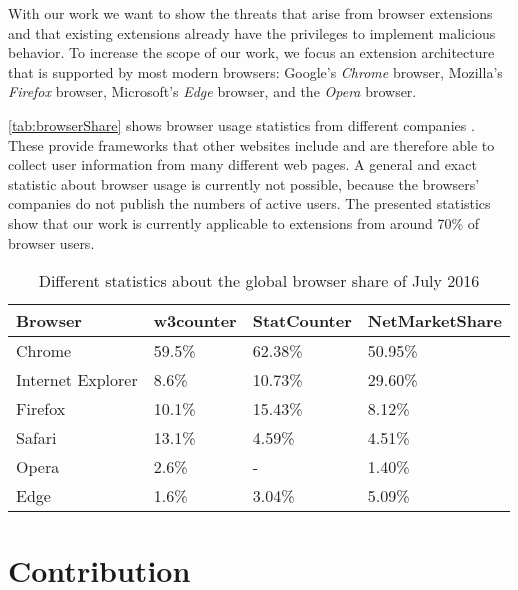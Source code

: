 	With our work we want to show the threats that arise from browser extensions and that existing extensions already have the privileges to implement malicious behavior. To increase the scope of our work, we focus an extension architecture that is supported by most modern browsers: Google's \textit{Chrome} browser, Mozilla's \textit{Firefox} browser, Microsoft's \textit{Edge} browser, and the \textit{Opera} browser.
	
	\autoref{tab:browserShare} shows browser usage statistics from different companies \cite{w3browserStats, statcounter, netmarketshare}. These provide frameworks that other websites include and are therefore able to collect user information from many different web pages. A general and exact statistic about browser usage is currently not possible, because the browsers' companies do not publish the numbers of active users. The presented statistics show that our work is currently applicable to extensions from around 70\% of browser users.

	\begin{table}
		\centering
		\begin{tabular}{|l|l|l|l|}
			\hline
			\textbf{Browser} & \textbf{w3counter} & \textbf{StatCounter} & \textbf{NetMarketShare} \\ \hline
			Chrome & 59.5\% & 62.38\% & 50.95\% \\ \hline
			Internet Explorer & 8.6\% & 10.73\% & 29.60\% \\ \hline
			Firefox & 10.1\% & 15.43\% & 8.12\% \\ \hline
			Safari & 13.1\% & 4.59\% & 4.51\% \\  \hline
			Opera & 2.6\% & - & 1.40\% \\ \hline
			Edge & 1.6\% & 3.04\% & 5.09\% \\ \hline
		\end{tabular}
		\caption{Different statistics about the global browser share of July 2016 \cite{w3browserStats, statcounter, netmarketshare}}
		\label{tab:browserShare}
	\end{table}	
	
\section{Contribution}
	
